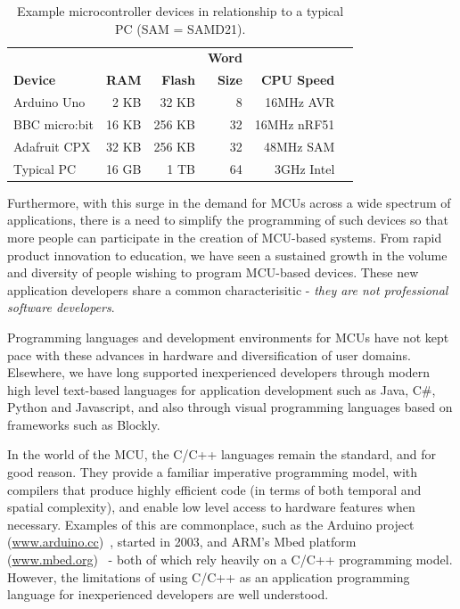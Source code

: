 \begin{table}[]
    \centering
    \begin{tabular}{|l|r|r|r|r|r|}
    \hline
                           &          &              & \bf{Word}  &                 \\
    \bf{Device}            & \bf{RAM} & \bf{Flash}   & \bf{Size}  & \bf{CPU Speed}  \\ \hline
    Arduino Uno            & 2 KB       & 32 KB      & 8          & 16MHz AVR       \\ \hline
    BBC micro:bit          & 16 KB      & 256 KB     & 32         & 16MHz nRF51     \\ \hline
    Adafruit CPX           & 32 KB      & 256 KB     & 32         & 48MHz SAM    \\ \hline
    Typical PC             & 16 GB      & 1 TB       & 64         & 3GHz Intel      \\ \hline
    \end{tabular}
    \caption{\label{table:devices}Example microcontroller devices in relationship to a typical PC (SAM = SAMD21).}
    \end{table}



Furthermore, with this surge in the demand for MCUs across a wide spectrum of applications, 
there is a need to simplify the programming of such devices so that more people can participate in 
the creation of MCU-based systems. From rapid product innovation to education,
we have seen a sustained growth in the volume and diversity of people wishing to program MCU-based devices.
These new application developers share a common characterisitic - \emph{they are not professional software developers}.

Programming languages and development environments for MCUs have not kept pace with these advances 
in hardware and diversification of user domains. Elsewhere, we have long supported inexperienced developers through  
modern high level text-based languages for application development such as Java, C\#, Python and Javascript, and also 
through visual programming languages based on frameworks such as Blockly. 

In the world of the MCU, the C/C++ languages remain the standard, and for good reason. 
They provide a familiar imperative programming model, with compilers that produce highly efficient code (in terms of both 
temporal and spatial complexity), and enable low level access to hardware features when necessary. Examples
of this are commonplace, such as the Arduino project (\url{www.arduino.cc})~\cite{buildingArduino2014},
started in 2003, and ARM's Mbed platform (\url{www.mbed.org})~\cite{ARMmbed} - both of which rely heavily on
a C/C++ programming model. However, the limitations of using C/C++ as an application programming language for 
inexperienced developers are well understood. 

